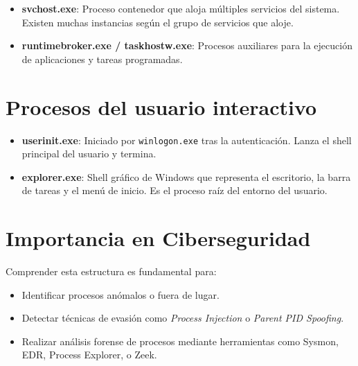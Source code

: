 \begin{itemize}
    \item \textbf{svchost.exe}: Proceso contenedor que aloja múltiples servicios
    del sistema. Existen muchas instancias según el grupo de servicios que
    aloje.
    \item \textbf{runtimebroker.exe / taskhostw.exe}: Procesos auxiliares para
    la ejecución de aplicaciones y tareas programadas.
\end{itemize}

\section*{Procesos del usuario interactivo}

\begin{itemize}
    \item \textbf{userinit.exe}: Iniciado por \texttt{winlogon.exe} tras la
    autenticación. Lanza el shell principal del usuario y termina.
    \item \textbf{explorer.exe}: Shell gráfico de Windows que representa el
    escritorio, la barra de tareas y el menú de inicio. Es el proceso raíz del
    entorno del usuario.
\end{itemize}

\section*{Importancia en Ciberseguridad}

Comprender esta estructura es fundamental para:
\begin{itemize}
    \item Identificar procesos anómalos o fuera de lugar.
    \item Detectar técnicas de evasión como \textit{Process Injection} o
    \textit{Parent PID Spoofing}.
    \item Realizar análisis forense de procesos mediante herramientas como
    Sysmon, EDR, Process Explorer, o Zeek.
\end{itemize}
